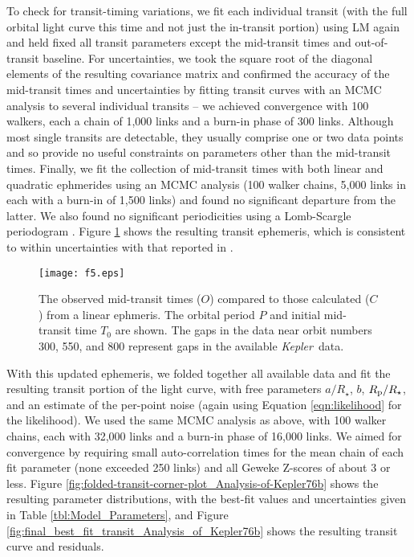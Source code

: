 \documentclass[manuscript]{aastex62}
\newcommand{\kepler}{{\it Kepler}}
\begin{document}
To check for transit-timing variations, we fit each individual transit (with the full orbital light curve this time and not just the in-transit portion) using LM again and held fixed all transit parameters except the mid-transit times and out-of-transit baseline. For uncertainties, we took the square root of the diagonal elements of the resulting covariance matrix \citep[p.~790]{Press:2007:NRE:1403886} and confirmed the accuracy of the mid-transit times and uncertainties by fitting transit curves with an MCMC analysis \citep{2013PASP..125..306F} to several individual transits -- we achieved convergence with 100 walkers, each a chain of 1,000 links and a burn-in phase of 300 links. Although most single transits are detectable, they usually comprise one or two data points and so provide no useful constraints on parameters other than the mid-transit times. Finally, we fit the collection of mid-transit times with both linear and quadratic ephmerides using an MCMC analysis (100 walker chains, 5,000 links in each with a burn-in of 1,500 links) and found no significant departure from the latter. We also found no significant periodicities using a Lomb-Scargle periodogram \citep{1976Ap&SS..39..447L, 1982ApJ...263..835S}. Figure \ref{fig:TTVs_Analysis_of_Kepler76b} shows the resulting transit ephemeris, which is consistent to within uncertainties with that reported in \citet{2013ApJ...771...26F}. 

\begin{figure}
    \texttt{[image: f5.eps]}
    \caption{The observed mid-transit times ($O$) compared to those calculated ($C$) from a linear ephmeris. The orbital period $P$ and initial mid-transit time $T_0$ are shown. The gaps in the data near orbit numbers 300, 550, and 800 represent gaps in the available \kepler\ data.\label{fig:TTVs_Analysis_of_Kepler76b}}
\end{figure}

With this updated ephemeris, we folded together all available data and fit the resulting transit portion of the light curve, with free parameters $a/R_\star$, $b$, $R_{\rm p}/R_\star$, and an estimate of the per-point noise (again using Equation \ref{eqn:likelihood} for the likelihood). We used the same MCMC analysis as above, with 100 walker chains, each with 32,000 links and a burn-in phase of 16,000 links. We aimed for convergence by requiring small auto-correlation times \citep[e.g.,][]{geyer1992} for the mean chain of each fit parameter (none exceeded 250 links) and all Geweke Z-scores \citep{Geweke92evaluatingthe} of about 3 or less. Figure \ref{fig:folded-transit-corner-plot_Analysis-of-Kepler76b} shows the resulting parameter distributions, with the best-fit values and uncertainties given in Table \ref{tbl:Model_Parameters}, and Figure \ref{fig:final_best_fit_transit_Analysis_of_Kepler76b} shows the resulting transit curve and residuals.
\end{document}
